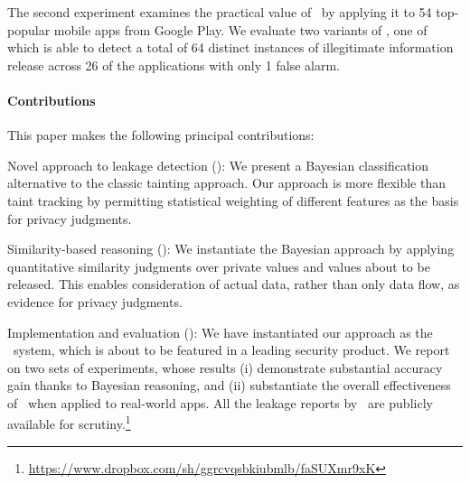 The second experiment examines the practical value of \Tool\ by applying it to 54 top-popular mobile apps from Google Play. We evaluate two variants of \Tool, one of which is able to detect a total of 64 distinct instances of illegitimate information release across 26 of the applications with only 1 false alarm.

\paragraph{Contributions} This paper makes the following principal contributions:
\begin{compactenum}
	\item Novel approach to leakage detection (): We present a Bayesian classification alternative to the classic tainting approach. Our approach is more flexible than taint 
	tracking by permitting statistical weighting of different features as the basis for privacy judgments.
	\item Similarity-based reasoning (): We instantiate the Bayesian approach by applying quantitative similarity judgments over private values and values 
	about to be released. This enables consideration of actual data, rather than only data flow, as evidence for privacy judgments.
	\item Implementation and evaluation (): We have instantiated our approach as the \Tool\ system, which is about to be featured in a leading security product. We report on two sets of experiments, whose results (i) demonstrate substantial accuracy gain thanks to Bayesian reasoning, and (ii) substantiate the overall effectiveness of \Tool\ when applied to real-world apps. All the leakage reports by \Tool\ are publicly available for scrutiny.\footnote{
		\href{https://www.dropbox.com/sh/ggrcvqsbkiubmlb/faSUXmr9xK}{https://www.dropbox.com/sh/ggrcvqsbkiubmlb/faSUXmr9xK}
	}
\end{compactenum}








 